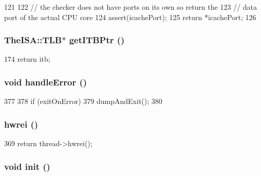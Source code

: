 \begin{DoxyCode}
121     {
122         // the checker does not have ports on its own so return the
123         // data port of the actual CPU core
124         assert(icachePort);
125         return *icachePort;
126     }
\end{DoxyCode}
\hypertarget{classCheckerCPU_a95b7e95d0558cd03d69613142fff9137}{
\subsubsection[{getITBPtr}]{\setlength{\rightskip}{0pt plus 5cm}TheISA::TLB$\ast$ getITBPtr ()}}
\label{classCheckerCPU_a95b7e95d0558cd03d69613142fff9137}



\begin{DoxyCode}
174 { return itb; }
\end{DoxyCode}
\hypertarget{classCheckerCPU_a70b275e63748ddd6da7d2171c540ccff}{
\subsubsection[{handleError}]{\setlength{\rightskip}{0pt plus 5cm}void handleError ()}}
\label{classCheckerCPU_a70b275e63748ddd6da7d2171c540ccff}



\begin{DoxyCode}
377     {
378         if (exitOnError)
379             dumpAndExit();
380     }
\end{DoxyCode}
\hypertarget{classCheckerCPU_a5f42e07ae335dff417664e91518c7f1e}{
\subsubsection[{hwrei}]{ hwrei ()}}
\label{classCheckerCPU_a5f42e07ae335dff417664e91518c7f1e}



\begin{DoxyCode}
369 { return thread->hwrei(); }
\end{DoxyCode}
\hypertarget{classCheckerCPU_a02fd73d861ef2e4aabb38c0c9ff82947}{
\subsubsection[{init}]{\setlength{\rightskip}{0pt plus 5cm}void init ()}}
\label{classCheckerCPU_a02fd73d861ef2e4aabb38c0c9ff82947}



